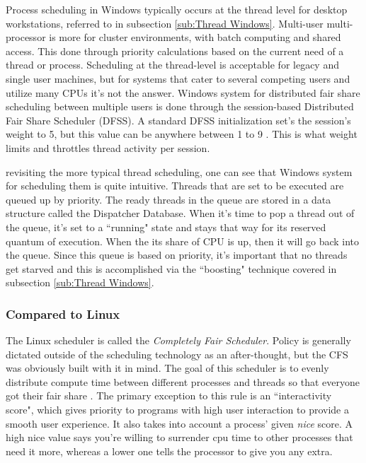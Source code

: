 \par Process scheduling in Windows typically occurs at the thread level for desktop workstations, referred to in subsection \ref{sub:Thread Windows}.
Multi-user multi-processor is more for cluster environments, with batch computing and shared access.
This done through priority calculations based on the current need of a thread or process.
Scheduling at the thread-level is acceptable for legacy and single user machines, but for systems that cater to several competing users and utilize many CPUs it's not the answer.
Windows system for distributed fair share scheduling between multiple users is done through the session-based Distributed Fair Share Scheduler (DFSS).
A standard DFSS initialization set's the session's weight to 5, but this value can be anywhere between 1 to 9 \cite{win:1}.
This is what weight limits and throttles thread activity per session.

\par revisiting the more typical thread scheduling, one can see that Windows system for scheduling them is quite intuitive.
Threads that are set to be executed are queued up by priority.
The ready threads in the queue are stored in a data structure called the Dispatcher Database.
When it's time to pop a thread out of the queue, it's set to a ``running" state and stays that way for its reserved quantum of execution.
When the its share of CPU is up, then it will go back into the queue.
Since this queue is based on priority, it's important that no threads get starved and this is accomplished via the ``boosting" technique covered in subsection \ref{sub:Thread Windows}.

\subsubsection{Compared to Linux}
\label{sub:Sub Processes Linux}
\par The Linux scheduler is called the \textit{Completely Fair Scheduler}.
Policy is generally dictated outside of the scheduling technology as an after-thought, but the CFS was obviously built with it in mind.
The goal of this scheduler is to evenly distribute compute time between different processes and threads so that everyone got their fair share \cite{linux:1}.
The primary exception to this rule is an ``interactivity score", which gives priority to programs with high user interaction to provide a smooth user experience.
It also takes into account a process' given \textit{nice} score.
A high nice value says you're willing to surrender cpu time to other processes that need it more, whereas a lower one tells the processor to give you any extra.

